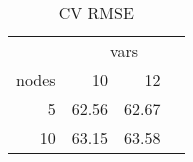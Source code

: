 \begin{table}

\caption{\label{tab:}CV RMSE}
\centering
\begin{tabular}[t]{r|r|r}
\hline
\multicolumn{1}{c|}{ } & \multicolumn{3}{c}{vars} \\
\cline{2-4}
nodes & 10 & 12\\
\hline
5 & 62.56 & 62.67\\
\hline
10 & 63.15 & 63.58\\
\hline
\end{tabular}
\end{table}